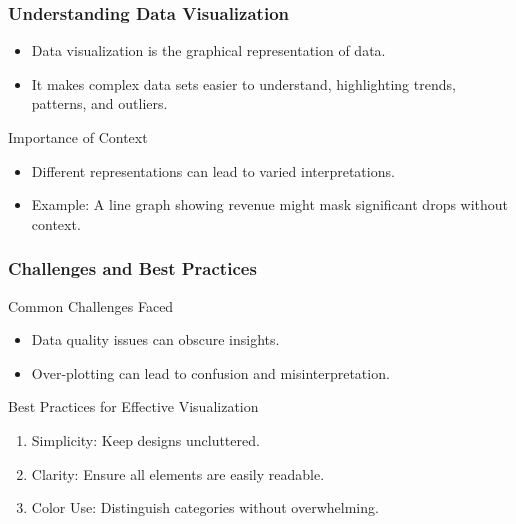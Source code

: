\documentclass[aspectratio=169]{beamer}
\begin{document}
\begin{frame}[fragile]
    \frametitle{Understanding Data Visualization}
    \begin{itemize}
        \item Data visualization is the graphical representation of data. 
        \item It makes complex data sets easier to understand, highlighting trends, patterns, and outliers.
    \end{itemize}
    \begin{block}{Importance of Context}
        \begin{itemize}
            \item Different representations can lead to varied interpretations.
            \item Example: A line graph showing revenue might mask significant drops without context.
        \end{itemize}
    \end{block}
\end{frame}

\begin{frame}[fragile]
    \frametitle{Challenges and Best Practices}
    \begin{block}{Common Challenges Faced}
        \begin{itemize}
            \item Data quality issues can obscure insights.
            \item Over-plotting can lead to confusion and misinterpretation.
        \end{itemize}
    \end{block}
    
    \begin{block}{Best Practices for Effective Visualization}
        \begin{enumerate}
            \item Simplicity: Keep designs uncluttered.
            \item Clarity: Ensure all elements are easily readable.
            \item Color Use: Distinguish categories without overwhelming.
        \end{enumerate}
    \end{block}
\end{frame}
\end{document}

